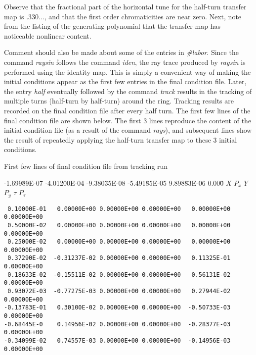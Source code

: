 Observe that the fractional part of the horizontal tune for the
half-turn transfer map is $.330\ldots$, and that the first order chromaticities
are near zero.  Next, note from the listing of the generating polynomial
that the transfer map has noticeable nonlinear content.

     Comment should also be made about some of the entries in {\em \#labor}.
Since the command {\em raysin } follows the command {\em iden}, the ray trace produced by
{\em raysin } is performed using the identity map.  This is simply a convenient way
of making the initial conditions appear as the first few entries in the
final condition file.  Later, the entry {\em half } eventually followed by the
command {\em track } results in the tracking of multiple turns (half-turn by
half-turn) around the ring. Tracking results are recorded on the final
condition file after every half turn.  The first few lines of the final
condition file are shown below.  The first 3 lines reproduce the content of
the initial condition file (as a result of the command {\em rays\/}), and
subsequent lines show the result of repeatedly applying the half-turn
transfer map to these 3 initial conditions.
\vspace{5mm}

       First few lines of final condition file from tracking run
\begin{footnotesize}
\begin{tt}
\begin{tabbing}
-1.699\=89E-07 -4.012\=00E-04 -9.380\=35E-08 -5.491\=85E-05 9.898\=83E-06 0.000\= \kill
\>$X$ \>$P_x$ \>$Y$ \>$P_y$ \>$\tau$ \>$P_{\tau}$
\end{tabbing}
\end{tt}
\vspace{-5mm}
\begin{verbatim}
 0.10000E-01   0.00000E+00 0.00000E+00 0.00000E+00   0.00000E+00 0.00000E+00
 0.50000E-02   0.00000E+00 0.00000E+00 0.00000E+00   0.00000E+00 0.00000E+00
 0.25000E-02   0.00000E+00 0.00000E+00 0.00000E+00   0.00000E+00 0.00000E+00
 0.37290E-02  -0.31237E-02 0.00000E+00 0.00000E+00   0.11325E-01 0.00000E+00
 0.18633E-02  -0.15511E-02 0.00000E+00 0.00000E+00   0.56131E-02 0.00000E+00
 0.93072E-03  -0.77275E-03 0.00000E+00 0.00000E+00   0.27944E-02 0.00000E+00
-0.13783E-01   0.30100E-02 0.00000E+00 0.00000E+00  -0.50733E-03 0.00000E+00
-0.68445E-0    0.14956E-02 0.00000E+00 0.00000E+00  -0.28377E-03 0.00000E+00
-0.34099E-02   0.74557E-03 0.00000E+00 0.00000E+00  -0.14956E-03 0.00000E+00
\end{verbatim}
\end{footnotesize}

